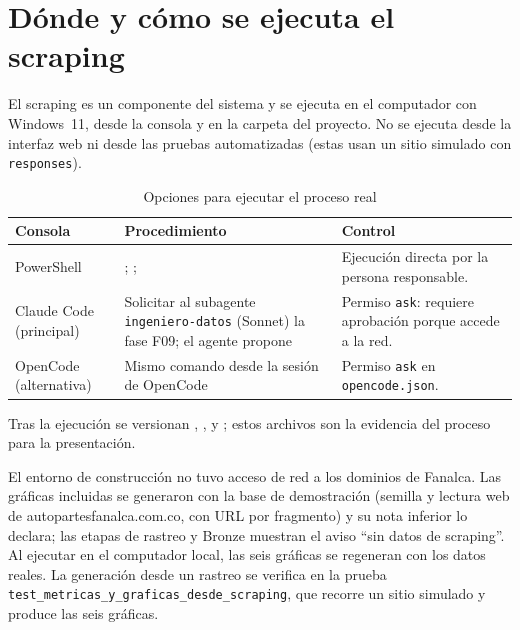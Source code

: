 \section{Dónde y cómo se ejecuta el scraping}
El scraping es un componente del sistema y se ejecuta en el computador con Windows~11, desde la consola y en la
carpeta del proyecto. No se ejecuta desde la interfaz web ni desde las pruebas automatizadas (estas usan un sitio
simulado con \texttt{responses}).
\begin{table}[H]\centering\small
\caption{Opciones para ejecutar el proceso real}\label{tab:donde-scraping}
\begin{tabularx}{\linewidth}{@{}P{3.2cm} X P{3.4cm}@{}}\toprule
Consola & Procedimiento & Control\\\midrule
PowerShell & ; ;  & Ejecución directa por la persona responsable.\\
Claude Code (principal) & Solicitar al subagente \texttt{ingeniero-datos} (Sonnet) la fase F09; el agente propone  & Permiso \texttt{ask}: requiere aprobación porque accede a la red.\\
OpenCode (alternativa) & Mismo comando desde la sesión de OpenCode & Permiso \texttt{ask} en \texttt{opencode.json}.\\\bottomrule
\end{tabularx}
\end{table}
Tras la ejecución se versionan , ,
 y ; estos archivos son la evidencia del proceso para la presentación.

\begin{nota}
El entorno de construcción no tuvo acceso de red a los dominios de Fanalca. Las gráficas incluidas se generaron
con la base de demostración (semilla y lectura web de autopartesfanalca.com.co, con URL por fragmento) y su nota
inferior lo declara; las etapas de rastreo y Bronze muestran el aviso ``sin datos de scraping''. Al ejecutar
 en el computador local, las seis gráficas se regeneran con los datos reales.
La generación desde un rastreo se verifica en la prueba \texttt{test\_metricas\_y\_graficas\_desde\_scraping},
que recorre un sitio simulado y produce las seis gráficas.
\end{nota}

